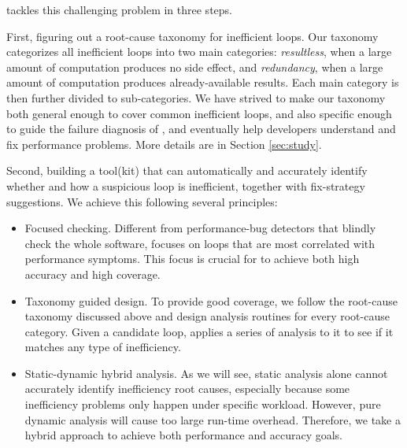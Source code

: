 \Tool tackles this challenging problem in three steps.

First, figuring out a root-cause taxonomy for inefficient loops.
Our taxonomy categorizes all inefficient loops into two main categories:
\emph{resultless}, when a large amount of computation produces
no side effect, and \emph{redundancy}, when a large amount of 
computation produces already-available results.
Each main category is then further divided to sub-categories.
We have strived to make our taxonomy both general enough to cover
common inefficient loops, and also specific enough to guide the failure
diagnosis of \Tool, and eventually
help developers understand
and fix performance problems. More details are
in Section \ref{sec:study}.
 
Second, building a tool(kit) \Tool that can automatically and accurately
identify whether and how a suspicious loop is inefficient, 
together with fix-strategy suggestions. 
We achieve this following several principles:

\begin{itemize}
\item Focused checking. 
Different from performance-bug detectors that blindly check the whole
software, \Tool focuses on loops that are
most correlated with performance symptoms. 
This focus is crucial for \Tool to achieve both high
accuracy and high coverage.

\item Taxonomy guided design. To provide good coverage, we follow
the root-cause taxonomy discussed above and design analysis routines for
every root-cause category. Given a candidate loop, \Tool
applies a series of analysis to it to see if it matches any type of inefficiency.

\item Static-dynamic hybrid analysis.
As we will see, static analysis alone cannot accurately identify 
inefficiency root causes, especially because some inefficiency problems only
happen under specific workload. However, pure dynamic analysis will 
cause too large 
run-time overhead. Therefore, we take a hybrid approach to achieve both
performance and accuracy goals.
\end{itemize}

